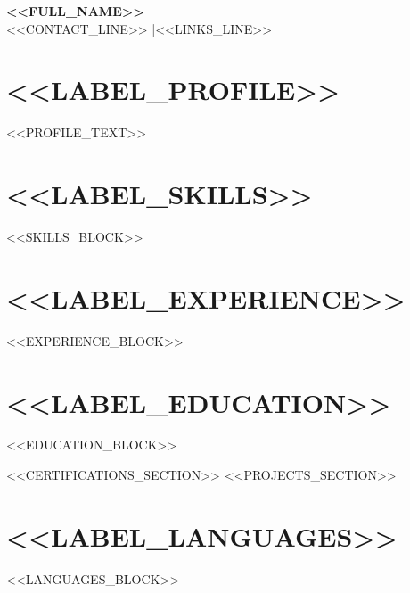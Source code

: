 \documentclass[a4paper,9pt]{article}
\begin{document}
\begin{center}
{\large\bfseries <<FULL_NAME>>}\\[2pt]
{\footnotesize <<CONTACT_LINE>> \quad|\quad <<LINKS_LINE>>}
\end{center}

\vspace{2pt}

\section{<<LABEL_PROFILE>>}
{\small <<PROFILE_TEXT>>}

\section{<<LABEL_SKILLS>>}
{\small <<SKILLS_BLOCK>>}

\section{<<LABEL_EXPERIENCE>>}
{\small <<EXPERIENCE_BLOCK>>}

\section{<<LABEL_EDUCATION>>}
{\small <<EDUCATION_BLOCK>>}

<<CERTIFICATIONS_SECTION>>
<<PROJECTS_SECTION>>

\section{<<LABEL_LANGUAGES>>}
{\small <<LANGUAGES_BLOCK>>}
\end{document}
